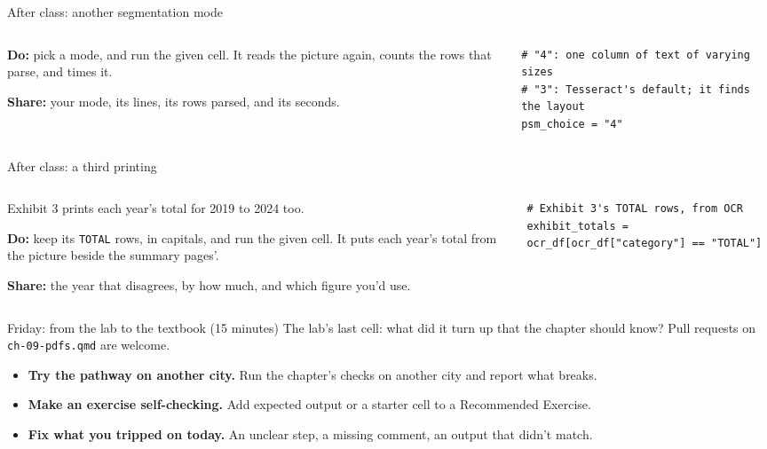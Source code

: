 \documentclass[9pt,aspectratio=169]{beamer}
\begin{document}
\begin{frame}[fragile]{After class: another segmentation mode}
    \begin{columns}[T]
        \begin{column}{0.37\textwidth}
            \textbf{Do:} pick a mode, and run the given cell. It reads the picture again, counts the rows that parse, and times it.

            \medskip
            \textbf{Share:} your mode, its lines, its rows parsed, and its seconds.
        \end{column}
        \begin{column}{0.6\textwidth}
\begin{lstlisting}
# "4": one column of text of varying sizes
# "3": Tesseract's default; it finds the layout
psm_choice = "4"
\end{lstlisting}
        \end{column}
    \end{columns}
\end{frame}

\begin{frame}[fragile]{After class: a third printing}
    \begin{columns}[T]
        \begin{column}{0.37\textwidth}
            Exhibit 3 prints each year's total for 2019 to 2024 too.

            \medskip
            \textbf{Do:} keep its \texttt{TOTAL} rows, in capitals, and run the given cell. It puts each year's total from the picture beside the summary pages'.

            \medskip
            \textbf{Share:} the year that disagrees, by how much, and which figure you'd use.
        \end{column}
        \begin{column}{0.6\textwidth}
\begin{lstlisting}
# Exhibit 3's TOTAL rows, from OCR
exhibit_totals = ocr_df[ocr_df["category"] == "TOTAL"]
\end{lstlisting}
        \end{column}
    \end{columns}
\end{frame}

\begin{frame}{Friday: from the lab to the textbook (15 minutes)}
    The lab's last cell: what did it turn up that the chapter should know? Pull requests on \texttt{ch-09-pdfs.qmd} are welcome.
    \begin{itemize}\small
        \item \textbf{Try the pathway on another city.} Run the chapter's checks on another city and report what breaks.
        \item \textbf{Make an exercise self-checking.} Add expected output or a starter cell to a Recommended Exercise.
        \item \textbf{Fix what you tripped on today.} An unclear step, a missing comment, an output that didn't match.
    \end{itemize}
\end{frame}
\end{document}
